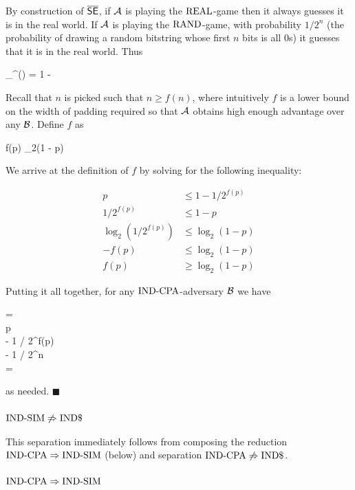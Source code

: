 By construction of $\overline{\textnormal{\textsf{SE}}}$, if ${\mathcal A}$ is playing the
$\textnormal{REAL}$-game then it always guesses it is in the real world.
If ${\mathcal A}$ is playing the $\textnormal{RAND}$-game, with probability $1 / 2^n$
(the probability of drawing a random bitstring whose first $n$ bits is all 0s)
it guesses that it is in the real world. Thus 

\bnm
\adv_{\overline{\SEscheme}}^{\INDRAND}(\advA) = 1 - 
\enm

Recall that $n$ is picked such that $n \geq f(n)$, where intuitively $f$ is a
lower bound on the width of padding required so that ${\mathcal A}$ obtains high enough
advantage over any ${\mathcal B}$. Define $f$ as

\bnm
f(p) \geq \log_2(1 - p)
\enm

We arrive at the definition of $f$ by solving for the following inequality:

\begin{align*}
  p &\leq 1 - 1 / 2^{f(p)} \\
  1 / 2^{f(p)} &\leq 1 - p \\
  \log_2(1 / 2^{f(p)}) &\leq \log_2(1 - p) \\
  - f(p) &\leq \log_2(1 - p) \\
  f(p) &\geq \log_2(1 - p)
\end{align*}

Putting it all together, for any $\textnormal{IND-CPA}$-adversary ${\mathcal B}$ we have

\bnm
  \AdvINDCPA{\overline{\SEscheme}}{\INDCPA}{\advB}
  = \AdvINDCPA{\SEscheme}{\advB} \\
  \leq p \\
   - 1 / 2^{f(p)} \\
   - 1 / 2^n \\
  = \AdvROR{\overline{\SEscheme}}{\advA}
\enm

as needed. $\blacksquare$

\subsubsection*{$\textnormal{IND-SIM} \not\Rightarrow \textnormal{IND\$}$}

This separation immediately follows from composing the reduction
$\textnormal{IND-CPA} \Rightarrow \textnormal{IND-SIM}$ (below) and separation
$\textnormal{IND-CPA} \not\Rightarrow \textnormal{IND\$}$.

\subsubsection*{$\textnormal{IND-CPA} \Rightarrow \textnormal{IND-SIM}$}

